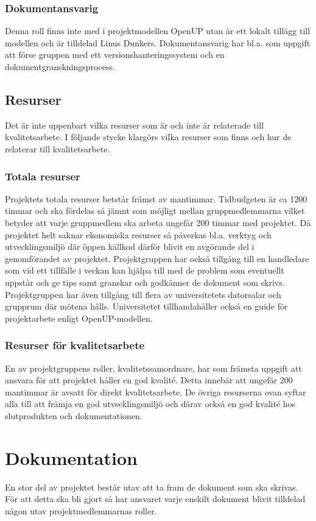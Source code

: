 \subsubsection{Dokumentansvarig}
Denna roll finns inte med i projektmodellen OpenUP utan är ett lokalt tillägg till modellen och är tilldelad Linus Dunkers. Dokumentansvarig har bl.a. som uppgift att förse gruppen med ett versionshanteringssystem och en dokumentgranskningsprocess.

\subsection{Resurser}
Det är inte uppenbart vilka resurser som är och inte är relaterade till kvalitetsarbete. I följande stycke klargörs vilka resurser som finns och hur de relaterar till kvalitetsarbete.
\subsubsection{Totala resurser}
Projektets totala resurser betstår främst av mantimmar. Tidbudgeten är ca 1200 timmar och ska fördelas så jämnt som möjligt mellan gruppmedlemmarna vilket betyder att varje gruppmedlem ska arbeta ungefär 200 timmar med projektet. Då projektet helt saknar ekonomiska resurser så påverkas bl.a. verktyg och utvecklingsmiljö där öppen källkod därför blivit en avgörande del i genomförandet av projektet. Projektgruppen har också tillgång till en handledare som vid ett tillfälle i veckan kan hjälpa till med de problem som eventuellt uppstår och ge tips samt granskar och godkänner de dokument som skrivs. Projektgruppen har även tillgång till flera av universitetets datorsalar och grupprum där mötena hålls. Universitetet tillhandahåller också en guide för projektarbete enligt OpenUP-modellen.
\subsubsection{Resurser för kvalitetsarbete}
En av projektgruppens roller, kvalitetssamordnare,  har som främsta uppgift att ansvara för att projektet håller en god kvalité. Detta innebär att ungefär 200 mantimmar är avsatt för direkt kvalitetsarbete. De övriga resurserna ovan syftar alla till att främja en god utvecklingsmiljö och därav också en god kvalité hos slutprodukten och dokumentationen.

\section{Dokumentation}
En stor del av projektet består utav att ta fram de dokument som ska skrivas. För att detta ska bli gjort så har ansvaret varje enskilt dokument blivit tilldelad någon utav projektmedlemmarnas roller.

